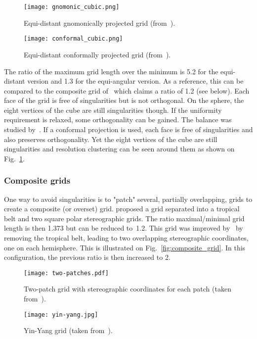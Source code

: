\begin{figure}
  \begin{minipage}{0.48\linewidth}
    \centering
    \texttt{[image: gnomonic\_cubic.png]}
    \caption{Equi-distant gnomonically projected grid (from~\cite{Putman2007}).}
    \label{fig:gnomonic_cubic}
  \end{minipage}
  \hfill
  \begin{minipage}{0.48\linewidth}
    \centering
    \texttt{[image: conformal\_cubic.png]}
    \caption{Equi-distant conformally projected grid (from~\cite{Putman2007}).}
    \label{fig:conformal_cubic}
  \end{minipage}
\end{figure}
The ratio of the maximum grid length over the minimum is 5.2 for the
equi-distant version and 1.3 for the equi-angular version. As a reference, this
can be compared to the composite grid of~\cite{Phillips1962} which claims a
ratio of 1.2 (see below).  Each face of the grid is free of singularities but
is not orthogonal. On the sphere, the eight vertices of the cube are still
singularities though.  If the uniformity requirement is relaxed, some
orthogonality can be gained. The balance was studied by~\cite{Putman2007}.
If a \gls{conformal} projection is used, each face is free of singularities and
also preserves orthogonality. Yet the eight vertices of the cube are still
singularities and resolution clustering can be seen around them as shown on
Fig.~\ref{fig:conformal_cubic}.

\subsubsection{Composite grids}
 One way to avoid singularities is to "patch" several, partially overlapping,
grids to create a composite (or overset) grid.
\cite{Phillips1957} proposed a grid separated into a tropical belt and two
square polar \gls{stereographic} grids. The ratio maximal/minimal grid length is then
1.373 but can be reduced to~1.2. This grid was improved by~\cite{Browning1989}
by removing the tropical belt, leading to two overlapping \gls{stereographic}
coordinates, one on each hemisphere. This is illustrated on
Fig.~\ref{fig:composite_grid}.
In this configuration, the previous ratio is then increased to 2.

\begin{figure}
  \begin{minipage}{0.48\linewidth}
    \centering
    \texttt{[image: two-patches.pdf]}
    \caption{Two-patch grid with stereographic coordinates for each patch (taken
      from~\cite{Williamson2007}).}
    \label{fig:composite_grid}
  \end{minipage}
  \hfill
  \begin{minipage}{0.48\linewidth}
    \centering
    \texttt{[image: yin-yang.jpg]}
    \caption{Yin-Yang grid (taken from~\cite{Williamson2007}).}
    \label{fig:yin-yang}
  \end{minipage}
\end{figure}

